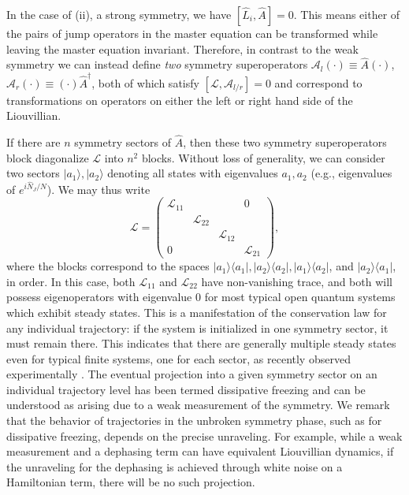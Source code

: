 In the case of (ii), a strong symmetry, we have $[\hat L_i, \hat A] = 0$. This means either of the pairs of jump operators in the master equation can be transformed while leaving the master equation invariant. Therefore, in contrast to the weak symmetry we can instead define \textit{two} symmetry superoperators $\mathcal{A}_l(\cdot) \equiv \hat A(\cdot)$, $\mathcal{A}_r (\cdot) \equiv (\cdot) \hat A^\dagger$, both of which satisfy $[\mathcal{L}, \mathcal{A}_{l/r}] = 0$ and correspond to transformations on operators on either the left or right hand side of the Liouvillian.

If there are $n$ symmetry sectors of $\hat A$, then these two symmetry superoperators block diagonalize $\mathcal{L}$ into $n^2$ blocks. Without loss of generality, we can consider two sectors $|a_1\rangle, |a_2\rangle$ denoting all states with eigenvalues $a_1, a_2$ (e.g., eigenvalues of $e^{i \hat N_J/N}$). We may thus write 
\begin{equation}
    \mathcal{L} = \left(
    \begin{array}{cccc}
    \mathcal{L}_{11} &  &  & 0 \\
     & \mathcal{L}_{22} &  &  \\
     &  &\mathcal{L}_{12} &   \\
    0 &  &  & \mathcal{L}_{21}
    \end{array}
    \right),
\end{equation}
where the blocks correspond to the spaces $|a_1\rangle \langle a_1|,|a_2\rangle \langle a_2|,|a_1\rangle \langle a_2|$, and $|a_2\rangle \langle a_1|$, in order. In this case, both $\mathcal{L}_{11}$ and $\mathcal{L}_{22}$ have non-vanishing trace, and both will possess eigenoperators with eigenvalue 0 for most typical open quantum systems which exhibit steady states. This is a manifestation of the conservation law for any individual trajectory: if the system is initialized in one symmetry sector, it must remain there. This indicates that there are generally multiple steady states even for typical finite systems, one for each sector, as recently observed experimentally \cite{Li2023}. The eventual projection into a given symmetry sector on an individual trajectory level has been termed dissipative freezing \cite{SanchezMunoz2019} and can be understood as arising due to a weak measurement of the symmetry. We remark that the behavior of trajectories in the unbroken symmetry phase, such as for dissipative freezing, depends on the precise unraveling. For example, while a weak measurement and a dephasing term can have equivalent Liouvillian dynamics, if the unraveling for the dephasing is achieved through white noise on a Hamiltonian term, there will be no such projection. 


